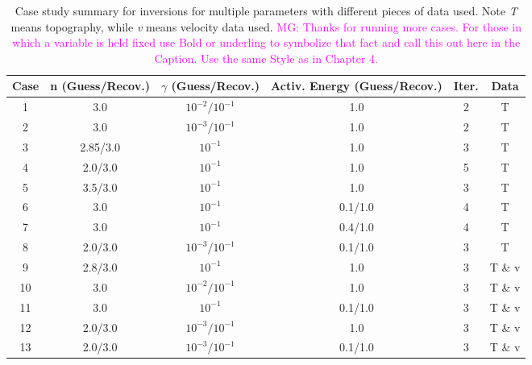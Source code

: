 \documentclass[12pt]{article}
\newcommand{\mgnote}[1]{\textcolor{magenta}{MG: #1}}
\begin{document}
\begin{table}
\centering
	\begin{table}[H]
		\caption{Case study summary for inversions for multiple parameters with different pieces of data used. Note \textit{T} means topography, while \textit{v} means velocity data used. \mgnote{Thanks for running more cases. For those in which a variable is held fixed use Bold or underling to symbolize that fact and call this out here in the Caption. Use the same Style as in Chapter 4.}} %
		\centering  %
		\begin{tabular}{c c c c c c} %
		\hline \hline                        %
		Case&n (Guess/Recov.) &$\gamma$ (Guess/Recov.)   &Activ. Energy (Guess/Recov.) &Iter. & Data  \\ [0.5ex] %
		\hline                  %
	        1 & 3.0  & $10^{-2}/10^{-1}$ &   1.0 & 2  & T\\
	        2 & 3.0  & $10^{-3}/10^{-1}$ & 1.0 & 2 & T\\
	        3 & 2.85/3.0  & $10^{-1}$ & 1.0  & 3 & T \\
	        4 & 2.0/3.0  & $10^{-1}$  & 1.0  & 5 & T \\
	        5 & 3.5/3.0  & $10^{-1}$   & 1.0  &3 & T \\
	        6 & 3.0  & $10^{-1}$  & 0.1/1.0  & 4 & T \\
	        7 & 3.0  & $10^{-1}$  & 0.4/1.0  & 4 & T \\
            8 & 2.0/3.0  & $10^{-3}/10^{-1}$ & 0.1/1.0  & 3 & T \\
	        9 & 2.8/3.0  & $10^{-1}$  & 1.0  & 3 & T \& v\\
	        10 & 3.0  & $10^{-2}/10^{-1}$ & 1.0  & 3 & T \& v\\
            11 & 3.0  & $10^{-1}$ & 0.1/1.0  & 3 & T \& v\\
            12 & 2.0/3.0  & $10^{-3}/10^{-1}$ & 1.0  & 3 & T \& v\\
            13 & 2.0/3.0  & $10^{-3}/10^{-1}$ & 0.1/1.0  & 3 & T \& v\\

                 
                \hline %
		\end{tabular}
		\label{table:inversions} %
		\end{table}

\end{table}
\end{document}
